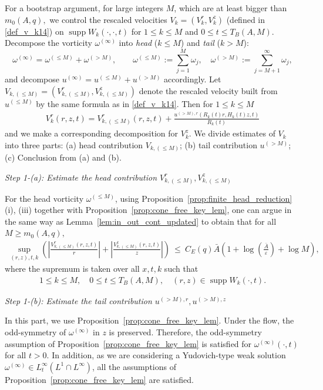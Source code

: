 \documentclass[reqno,11pt]{amsart}
\newcommand{\supp}{\operatorname{supp}}
\begin{document}
For a bootstrap argument, for large integers $M$, which are at least bigger than $m_0(A,q),$ we control the rescaled velocities $V_k=(V_k^r,V_k^z)$ (defined in \eqref{def_v_k14}) on $\supp W_k(\cdot,\cdot,t)$ for $1\leq k \leq M$ and $0\leq t\leq T_B(A,M)$.
Decompose the vorticity $\omega^{(\infty)}$ into \emph{head} ($k\leq M$) and \emph{tail} ($k>M$):
\[
\omega^{(\infty)}=\omega^{(\leq M)}+\omega^{(>M)},\qquad
\omega^{(\leq M)}:=\sum_{j=1}^M\omega_j,\quad \omega^{(>M)}:=\sum_{j=M+1}^\infty\omega_j,
\]
and decompose $u^{(\infty)}=u^{(\leq M)}+u^{(>M)}$ accordingly.
Let  $V_{k,(\leq M)}=(V_{k,(\leq M)}^r,V_{k,(\leq M)}^z)$ denote the rescaled velocity built from $u^{(\leq M)}$ by the same formula as in
\eqref{def_v_k14}. Then for $1\leq k \leq M$
    \begin{align*}
        V_k^r(r,z,t)
    =
        V_{k,(\leq M)}^r (r,z,t) +\frac{u^{(>M),r}(R_k(t) r, H_k(t) z, t)}{R_k(t)}
    \end{align*}
and we make a corresponding decomposition for $V_k^z$. 
We divide estimates of $V_k$ into three parts: (a) head contribution $V_{k,(\leq M)}$; (b) tail contribution $u^{(>M)}$; (c) Conclusion from (a) and (b).

\medskip
\noindent \emph{Step 1-(a): Estimate the head contribution $V_{k,(\leq M)}^r, V_{k,(\leq M)}^z$}

For the head vorticity $\omega^{(\leq M)}$, using Proposition~\ref{prop:finite_head_reduction}(i), (iii) together with Proposition~\ref{prop:cone_free_key_lem}, one can 
argue in the same way as Lemma~\ref{lem:in_out_cont_updated}  to obtain that for all $M\geq m_0(A,q),$
\begin{align}\label{eq:Vk_est_first_m}
\sup_{(r,z),t,k}
\left(
\left|\frac{V_{k,(\leq M)}^r(r,z,t)}{r}\right|+\left|\frac{V_{k,(\leq M)}^z(r,z,t)}{z}\right| \right) 
\ \le\ C_E(q)\bar A\left( 1 + \log\left(\frac{\bar A}{\varepsilon}\right) + \log M \right),
\end{align}
where the supremum is taken over all $x,t,k$ such that
    \begin{align*}
        1\leq k \leq M,\quad
        0\leq t \leq T_B(A,M),\quad
        (r,z)\in \supp W_k(\cdot,t).
    \end{align*}

\medskip
\noindent \emph{Step 1-(b): Estimate the tail contribution $u^{(>M),r}, u^{(>M),z}$} 



In this part, we use Proposition~\ref{prop:cone_free_key_lem}. Under the flow, the odd-symmetry of $\omega^{(\infty)}$ in $z$ is preserved.   Therefore, the odd-symmetry assumption of Proposition~\ref{prop:cone_free_key_lem} is satisfied for $\omega^{(\infty)}(\cdot,t)$ for all $t>0$. In addition, as we are considering a Yudovich-type weak solution $\omega^{(\infty)}\in L^\infty_t (L^1\cap L^\infty)$, all the assumptions of Proposition~\ref{prop:cone_free_key_lem} are satisfied.
\end{document}
